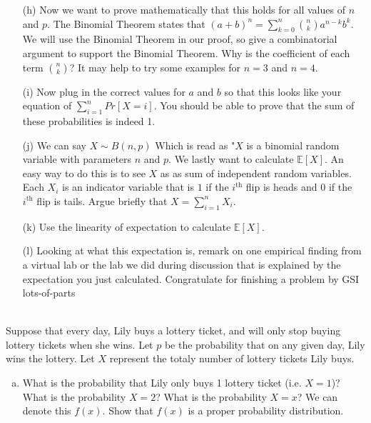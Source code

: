 \documentclass[]{article}
\begin{document}
\begin{qunlist}
\begin{enumerate}
\qpart
\item[(h)] Now we want to prove mathematically that this holds for all values of $n$ and $p$. The Binomial Theorem states that $(a+b)^n = \sum\nolimits_{k=0}^n \binom{n}{k} a^{n-k}b^k $. We will use the Binomial Theorem in our proof, so give a combinatorial argument to support the Binomial Theorem. Why is the coefficient of each term $\binom{n}{k}$? It may help to try some examples for $n=3$ and $n=4$.
\qpart
\item[(i)] Now plug in the correct values for $a$ and $b$ so that this looks like your equation of $\sum\nolimits_{i=1}^n Pr[X=i]$. You should be able to prove that the sum of these probabilities is indeed 1.
\qpart
\item[(j)] We can say $X \sim B(n,p)$ Which is read as "$X$ is a binomial random variable with parameters $n$ and $p$. We lastly want to calculate $\mathbb{E}[X]$. An easy way to do this is to see $X$ as as sum of independent random variables. Each $X_i$ is an indicator variable that is $1$ if the $i^{\text{th}}$ flip is heads and $0$ if the $i^{\text{th}}$ flip is tails. Argue briefly that $X = \sum\nolimits_{i=1}^nX_i$.
\qpart
\item[(k)] Use the linearity of expectation to calculate $\mathbb{E}[X]$.
\qpart
\item[(l)] Looking at what this expectation is, remark on one empirical finding from a virtual lab or the lab we did during discussion that is explained by the expectation you just calculated. Congratulate for finishing a problem by GSI lots-of-parts 
\end{enumerate}



 \\ Suppose that every day, Lily buys a lottery ticket, and will only stop buying lottery tickets when she wins.  Let $p$ be the probability that on any given day, Lily wins the lottery.  Let $X$ represent the totaly number of lottery tickets Lily buys.

\begin{enumerate}[a)]

\qpart
\item What is the probability that Lily only buys 1 lottery ticket (i.e. $X=1$)?  What is the probability $X=2$?  What is the probability $X=x$?  We can denote this $f(x)$.
Show that $f(x)$ is a proper probability distribution.


\end{enumerate}
\end{qunlist}
\end{document}
